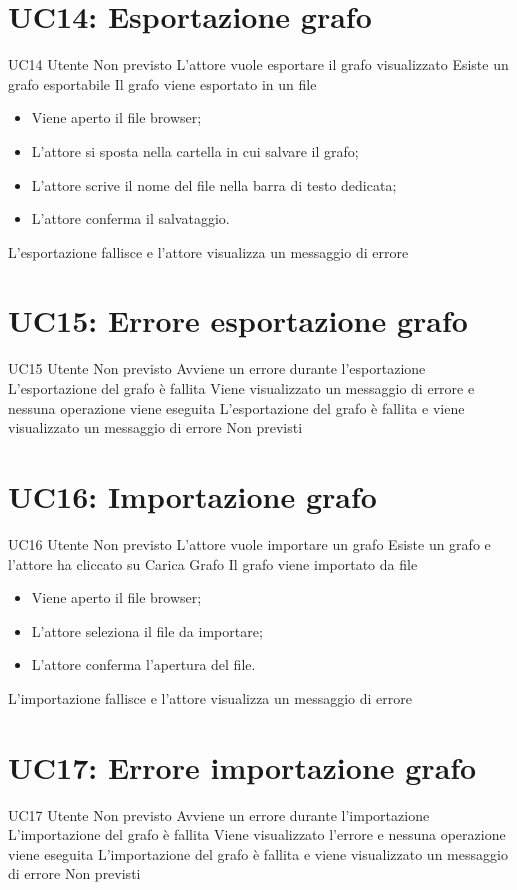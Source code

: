 \documentclass[../AnalisideiRequisiti.tex]{subfiles}
\begin{document}
\section{UC14: Esportazione grafo}
\UserCase
{UC14}
{Utente}
{Non previsto}
{L'attore vuole esportare il grafo visualizzato}
{Esiste un grafo esportabile}
{Il grafo viene esportato in un file}
{
	\begin{itemize}
			\item{} Viene aperto il file browser;
			\item{} L'attore si sposta nella cartella in cui salvare il grafo;
			\item{} L'attore scrive il nome del file nella barra di testo dedicata;
			\item{} L'attore conferma il salvataggio.
	\end{itemize}
}
{L'esportazione fallisce e l'attore visualizza un messaggio di errore }

\section{UC15: Errore esportazione grafo}
\UserCase
{UC15}
{Utente}
{Non previsto}
{Avviene un errore durante l'esportazione}
{L'esportazione del grafo è fallita}
{Viene visualizzato un messaggio di errore e nessuna operazione viene eseguita}
{L'esportazione del grafo è fallita e viene visualizzato un messaggio di errore}
{Non previsti}

\section{UC16: Importazione grafo}

\UserCase
{UC16}
{Utente}
{Non previsto}
{L'attore vuole importare un grafo}
{Esiste un grafo e l'attore ha cliccato su Carica Grafo }
{Il grafo viene importato da file}
{
	\begin{itemize}
			\item{} Viene aperto il file browser;
			\item{} L'attore seleziona il file da importare;
			\item{} L'attore conferma l'apertura del file.
	\end{itemize}
}
{L'importazione fallisce e l'attore visualizza un messaggio di errore }

\section{UC17: Errore importazione grafo}
\UserCase
{UC17}
{Utente}
{Non previsto}
{Avviene un errore durante l'importazione}
{L'importazione del grafo è fallita}
{Viene visualizzato l'errore e nessuna operazione viene eseguita}
{L'importazione del grafo è fallita e viene visualizzato un messaggio di errore}
{Non previsti}
\end{document}
